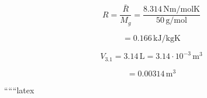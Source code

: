 \begin{equation*}
    R = \frac{\bar{R}}{M_g} = \frac{8.314 \, \text{Nm/molK}}{50 \, \text{g/mol}}
\end{equation*}

\begin{equation*}
    = 0.166 \, \text{kJ/kgK}
\end{equation*}

\begin{equation*}
    V_{3.1} = 3.14 \, \text{L} = 3.14 \cdot 10^{-3} \, \text{m}^3
\end{equation*}

\begin{equation*}
    = 0.00314 \, \text{m}^3
\end{equation*}

``````latex